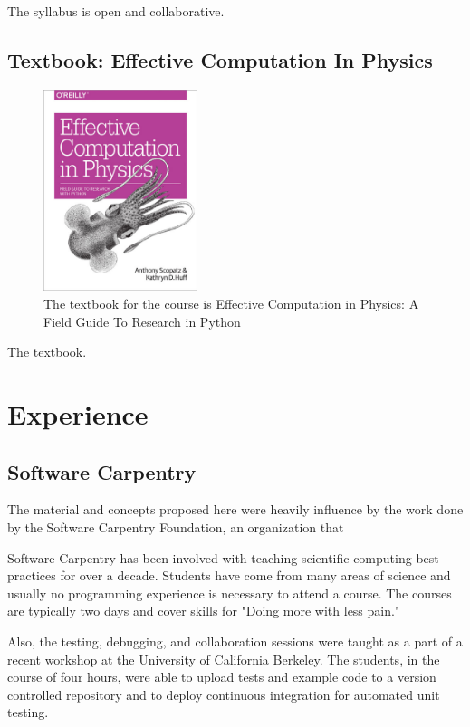 \documentclass{anstrans}
\begin{document}
The syllabus is open and collaborative.

\subsection{Textbook: Effective Computation In Physics}

\begin{figure}[htbp!]
\begin{center}
\includegraphics[width=0.4\textwidth]{ecip.eps}
\end{center}
\caption{The textbook for the course is Effective Computation in Physics: A Field Guide To Research in Python}
\label{fig:book}
\end{figure}

The textbook.
\section{Experience}

\subsection{Software Carpentry}

The material and concepts proposed here were heavily influence by the work done
by the Software Carpentry Foundation, an organization that

Software Carpentry has been involved with teaching scientific computing best
practices for over a decade. Students have come from many areas of science and
usually no programming experience is necessary to attend a course. The courses
are typically two days and cover skills for "Doing more with less pain."

Also, the testing, debugging, and collaboration sessions were taught as a part
of a recent workshop at the University of California Berkeley. The students, in
the course of four hours, were able to upload tests and example code to a
version controlled repository and to deploy continuous integration for
automated unit testing.
\end{document}
